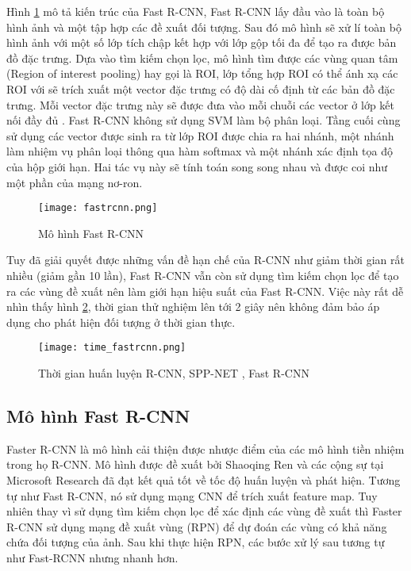\documentclass[../the.tex]{subfiles}
\begin{document}
\bigskip

{\fontsize{13}{12} \selectfont
	Hình \ref{fig:fastrcnn} mô tả kiến trúc của Fast R-CNN, Fast R-CNN lấy đầu vào là toàn bộ hình ảnh và một tập hợp các đề xuất đối tượng. Sau đó mô hình sẽ xử lí toàn bộ hình ảnh với một số lớp tích chập kết hợp với lớp gộp tối đa để tạo ra được bản đồ đặc trưng.
	Dựa vào tìm kiếm chọn lọc, mô hình tìm được các vùng quan tâm (Region of interest pooling) hay gọi là ROI, lớp tổng hợp ROI có thể ánh xạ các ROI với sẽ trích xuất một vector đặc trưng có độ dài cố định từ các bản đồ đặc trưng. Mỗi vector đặc trưng này sẽ được đưa vào mỗi chuỗi các vector ở lớp kết nối đầy đủ \cite{girshick2015fast}.
	Fast R-CNN không sử dụng SVM làm bộ phân loại. Tầng cuối cùng sử dụng các vector được sinh ra từ lớp ROI được chia ra hai nhánh, một nhánh làm nhiệm vụ phân loại thông qua hàm softmax và một nhánh xác định tọa độ của hộp giới hạn. Hai tác vụ này sẽ tính toán song song nhau và được coi như một phần của mạng nơ-ron.
}

\begin{figure}[H]
	\centering
	\texttt{[image: fastrcnn.png]}
	\caption{Mô hình Fast R-CNN \cite{girshick2015fast}}
	\label{fig:fastrcnn}
\end{figure}

\bigskip

{\fontsize{13}{12} \selectfont
	Tuy đã giải quyết được những vấn đề hạn chế của R-CNN như giảm thời gian rất nhiều (giảm gần 10 lần), Fast R-CNN vẫn còn sử dụng tìm kiếm chọn lọc để tạo ra các vùng đề xuất nên làm giới hạn hiệu suất của Fast R-CNN. Việc này rất dễ nhìn thấy hình \ref{fig:timefastrcnn},
	thời gian thử nghiệm lên tới 2 giây nên không đảm bảo áp dụng cho phát hiện đối tượng ở thời gian thực.
}

\begin{figure}[H]
	\centering
	\texttt{[image: time\_fastrcnn.png]}
	\caption{Thời gian huấn luyện R-CNN, SPP-NET \cite{He_2014}, Fast R-CNN \cite{testtimefastrcnn}}
	\label{fig:timefastrcnn}
\end{figure}

\subsection{Mô hình Fast R-CNN}
{\fontsize{13}{12} \selectfont

	Faster R-CNN là mô hình cải thiện được nhược điểm của các mô hình tiền nhiệm trong họ R-CNN. Mô hình được đề xuất bởi
	Shaoqing Ren và các cộng sự tại Microsoft Research \cite{ren2016faster} đã
	đạt kết quả tốt về tốc độ huấn luyện và phát hiện. Tương tự như Fast R-CNN, nó sử dụng mạng CNN để trích xuất feature map.
	Tuy nhiên thay vì sử dụng tìm kiếm chọn lọc để xác định các vùng đề xuất thì Faster R-CNN sử dụng mạng đề xuất vùng (RPN) để dự đoán các vùng có khả năng chứa đối tượng của ảnh.
	Sau khi thực hiện RPN, các bước xử lý sau tương tự như Fast-RCNN nhưng nhanh hơn.
}
\end{document}
